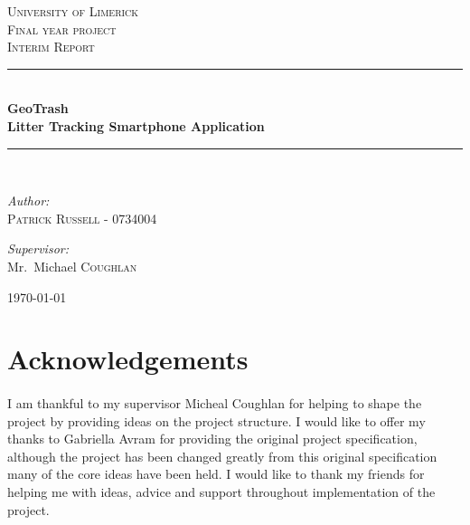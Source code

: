\documentclass[12pt]{article}
\newcommand{\HRule}{\rule{\linewidth}{0.5mm}}
\begin{document}
\begin{titlepage}

\begin{center}

   
\textsc{\LARGE University of Limerick}\\[1.5cm]

\textsc{\Large Final year project}\\[0.5cm]

\textsc{\Large Interim Report}\\[0.5cm]

\HRule \\[0.4cm]
{ \huge \bfseries GeoTrash}\\[0.4cm]
{ \small \bfseries Litter Tracking Smartphone Application}\\[0.4cm]

\HRule \\[1.5cm]

\begin{minipage}{0.4\textwidth}
\begin{flushleft} \large
\emph{Author:}\\
\textsc{Patrick Russell - 0734004}
\end{flushleft}
\end{minipage}
\begin{minipage}{0.4\textwidth}
\begin{flushright} \large
\emph{Supervisor:} \\
Mr.~Michael \textsc{Coughlan}
\end{flushright}
\end{minipage}

\vfill

{\large \today}

\end{center}

\end{titlepage}

\newpage

\label{sec:Acknowledgements}
\section{Acknowledgements}
\paragraph{}
I am thankful to my supervisor Micheal Coughlan for helping to shape the project by providing ideas on the project structure. I would like to offer my thanks to Gabriella Avram for providing the original project specification, although the project has been changed greatly from this original specification many of the core ideas have been held. 
I would like to thank my friends for helping me with ideas, advice and support throughout implementation of the project. 
\end{document}
